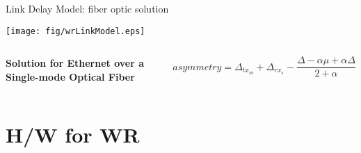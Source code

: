 \documentclass[compress,red]{beamer}
\begin{document}
\begin{frame}{Link Delay Model: fiber optic solution}

  \begin{center}
  \texttt{[image: fig/wrLinkModel.eps]}
  \end{center}

  \begin{columns}[c]
  \column{1.5in}

    \begin{center}
      \textbf{Solution for Ethernet over a Single-mode Optical Fiber}
    \end{center}    

  \column{2.7in}

    \begin{equation}
      \nonumber asymmetry = \Delta_{tx_m} + \Delta_{rx_s} - \frac{\Delta - \alpha \mu + \alpha \Delta}{2 + \alpha}
    \end{equation}

  \end{columns}

\end{frame}
% 
% 
\section{H/W for WR}
\end{document}
